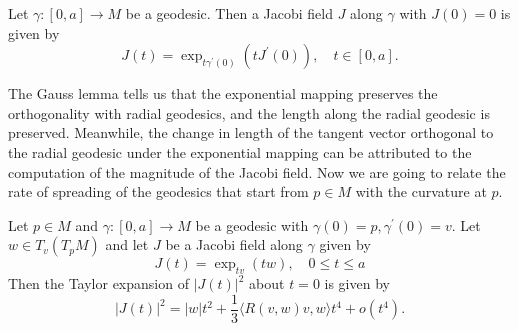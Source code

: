 \documentclass{ctexart}
\begin{document}
\begin{corollary}
  Let $\gamma:[0, a] \rightarrow M$ be a geodesic. Then a Jacobi field $J$ along $\gamma$ with $J(0)=0$ is given by
  $$
  J(t)=\exp_{t \gamma^{\prime}(0)} \left(t J^{\prime}(0)\right), \quad t \in[0, a] .
  $$
\end{corollary}

The Gauss lemma tells us that the exponential mapping preserves the orthogonality with radial geodesics, and the length along the radial geodesic is preserved. 
Meanwhile, the change in length of the tangent vector orthogonal to the radial geodesic under the exponential mapping can be attributed to the computation of the magnitude of the Jacobi field.
Now we are going to relate the rate of spreading of the geodesics that start from $p \in M$ with the curvature at $p$. 
\begin{proposition}
  Let $p \in M$ and $\gamma:[0, a] \rightarrow M$ be a geodesic with $\gamma(0)=p, \gamma^{\prime}(0)=v$. Let $w \in T_v\left(T_p M\right)$ and let $J$ be a Jacobi field along $\gamma$ given by
  $$
  J(t)=\exp_{t v}(t w), \quad 0 \leq t \leq a
  $$
  Then the Taylor expansion of $|J(t)|^2$ about $t=0$ is given by
  $$
  |J(t)|^2=|w|t^2+\frac{1}{3}\langle R(v, w) v, w\rangle t^4+o(t^4).
  $$
\end{proposition}
\end{document}
